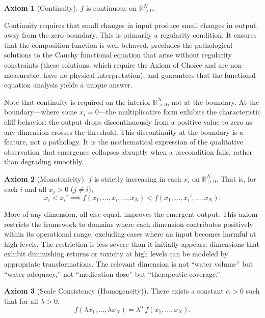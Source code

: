 \documentclass[12pt, a4paper]{article}
\theoremstyle{definition}
\newtheorem{axiom}{Axiom}
\theoremstyle{remark}
\newcommand{\Rp}{\mathbb{R}_{>0}}
\begin{document}
\begin{axiom}[Continuity]\label{ax:cont}
$f$ is continuous on $\Rp^N$.
\end{axiom}

\noindent Continuity requires that small changes in input produce small changes in output, away from the zero boundary. This is primarily a regularity condition. It ensures that the composition function is well-behaved, precludes the pathological solutions to the Cauchy functional equation that arise without regularity constraints (these solutions, which require the Axiom of Choice and are non-measurable, have no physical interpretation), and guarantees that the functional equation analysis yields a unique answer.

Note that continuity is required on the interior $\Rp^N$, not at the boundary. At the boundary---where some $x_i = 0$---the multiplicative form exhibits the characteristic cliff behavior: the output drops discontinuously from a positive value to zero as any dimension crosses the threshold. This discontinuity at the boundary is a feature, not a pathology. It is the mathematical expression of the qualitative observation that emergence collapses abruptly when a precondition fails, rather than degrading smoothly.

\begin{axiom}[Monotonicity]\label{ax:mono}
$f$ is strictly increasing in each $x_i$ on $\Rp^N$. That is, for each $i$ and all $x_j > 0$ ($j \neq i$),
\[
x_i < x_i' \implies f(x_1, \ldots, x_i, \ldots, x_N) < f(x_1, \ldots, x_i', \ldots, x_N).
\]
\end{axiom}

\noindent More of any dimension, all else equal, improves the emergent output. This axiom restricts the framework to domains where each dimension contributes positively within its operational range, excluding cases where an input becomes harmful at high levels. The restriction is less severe than it initially appears: dimensions that exhibit diminishing returns or toxicity at high levels can be modeled by appropriate transformations. The relevant dimension is not ``water volume'' but ``water adequacy,'' not ``medication dose'' but ``therapeutic coverage.''

\begin{axiom}[Scale Consistency (Homogeneity)]\label{ax:scale}
There exists a constant $\alpha > 0$ such that for all $\lambda > 0$,
\[
f(\lambda x_1, \ldots, \lambda x_N) = \lambda^\alpha \, f(x_1, \ldots, x_N).
\]
\end{axiom}
\end{document}
